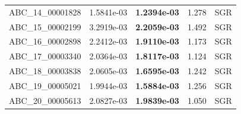 \begin{table}[t]
\begin{tabular}{lrrrr}
ABC\_14\_00001828 & 1.5841e-03 & \textbf{1.2394e-03} & 1.278 & SGR \\
ABC\_15\_00002199 & 3.2919e-03 & \textbf{2.2059e-03} & 1.492 & SGR \\
ABC\_16\_00002898 & 2.2412e-03 & \textbf{1.9110e-03} & 1.173 & SGR \\
ABC\_17\_00003340 & 2.0364e-03 & \textbf{1.8117e-03} & 1.124 & SGR \\
ABC\_18\_00003838 & 2.0605e-03 & \textbf{1.6595e-03} & 1.242 & SGR \\
ABC\_19\_00005021 & 1.9944e-03 & \textbf{1.5884e-03} & 1.256 & SGR \\
ABC\_20\_00005613 & 2.0827e-03 & \textbf{1.9839e-03} & 1.050 & SGR \\
\bottomrule
\end{tabular}
\end{table}
